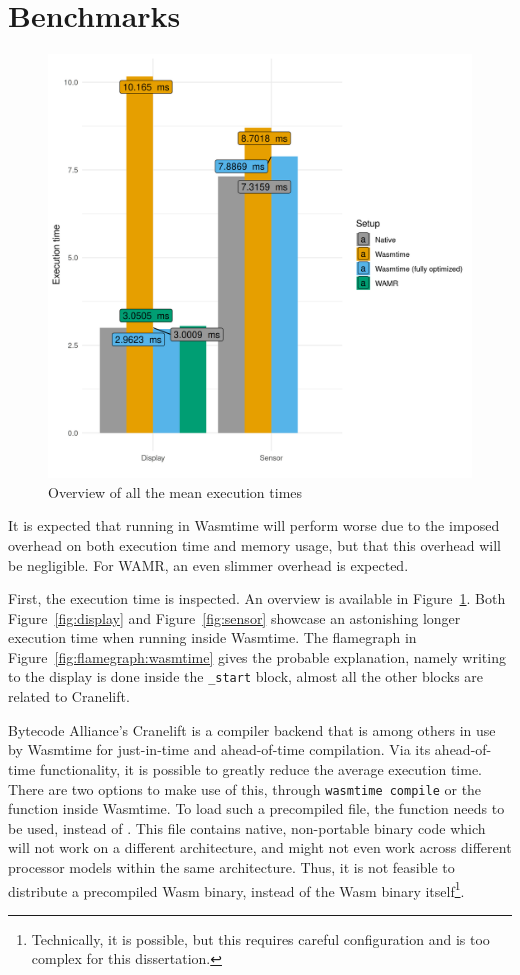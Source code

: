 \section{Benchmarks}

\begin{figure}[h]
  \centering
  \includegraphics[width=.5\textwidth]{figures/execution_times}
  \caption{Overview of all the mean execution times}
  \label{fig:all:times}
\end{figure}

It is expected that running in Wasmtime will perform worse due to the imposed overhead on both execution time and memory usage, but that this overhead will be negligible. For WAMR, an even slimmer overhead is expected.

First, the execution time is inspected. An overview is available in Figure~\ref{fig:all:times}.
Both Figure~\ref{fig:display} and Figure~\ref{fig:sensor} showcase an astonishing longer execution time when running inside Wasmtime. The flamegraph in Figure~\ref{fig:flamegraph:wasmtime} gives the probable explanation, namely writing to the display is done inside the \texttt{\_start} block, almost all the other blocks are related to Cranelift.

Bytecode Alliance's Cranelift is a compiler backend that is among others in use by Wasmtime for just-in-time and ahead-of-time compilation. Via its ahead-of-time functionality, it is possible to greatly reduce the average execution time. There are two options to make use of this, through \texttt{wasmtime compile} or the  function inside Wasmtime. To load such a precompiled file, the  function needs to be used, instead of . This file contains native, non-portable binary code which will not work on a different architecture, and might not even work across different processor models within the same architecture. Thus, it is not feasible to distribute a precompiled \gls{Wasm} binary, instead of the \gls{Wasm} binary itself\footnote{Technically, it is possible, but this requires careful configuration and is too complex for this dissertation.}.

